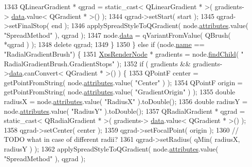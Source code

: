 \begin{DoxyCode}
1343             QLinearGradient * qgrad = \textcolor{keyword}{static\_cast<} QLinearGradient * \textcolor{keyword}{>}( gradients->
      \hyperlink{classXpsRenderNode_a1b07b9ac5eb86bec6d9f94ec5c855065}{data}.value< QGradient * >() );
1344             qgrad->setStart( start );
1345             qgrad->setFinalStop( end );
1346             applySpreadStyleToQGradient( node.\hyperlink{classXpsRenderNode_a7f6fca2e06dd119e7eb20139af6c8477}{attributes}.value( \textcolor{stringliteral}{"SpreadMethod"} ), qgrad );
1347             node.\hyperlink{classXpsRenderNode_a1b07b9ac5eb86bec6d9f94ec5c855065}{data} = qVariantFromValue( QBrush( *qgrad ) );
1348             \textcolor{keyword}{delete} qgrad;
1349         \}
1350     \} \textcolor{keywordflow}{else} \textcolor{keywordflow}{if} (node.\hyperlink{classXpsRenderNode_a7b3d33b9669c0235e095d5efc870ccf0}{name} == \textcolor{stringliteral}{"RadialGradientBrush"}) \{
1351         \hyperlink{classXpsRenderNode}{XpsRenderNode} * gradients = node.\hyperlink{classXpsRenderNode_a91777855666ee3b327a67485b9d50f84}{findChild}( \textcolor{stringliteral}{"
      RadialGradientBrush.GradientStops"} );
1352         \textcolor{keywordflow}{if} ( gradients && gradients->\hyperlink{classXpsRenderNode_a1b07b9ac5eb86bec6d9f94ec5c855065}{data}.canConvert< QGradient * >() ) \{
1353             QPointF center = getPointFromString( node.\hyperlink{classXpsRenderNode_a7f6fca2e06dd119e7eb20139af6c8477}{attributes}.value( \textcolor{stringliteral}{"Center"} ) );
1354             QPointF origin = getPointFromString( node.\hyperlink{classXpsRenderNode_a7f6fca2e06dd119e7eb20139af6c8477}{attributes}.value( \textcolor{stringliteral}{"GradientOrigin"} ) );
1355             \textcolor{keywordtype}{double} radiusX = node.\hyperlink{classXpsRenderNode_a7f6fca2e06dd119e7eb20139af6c8477}{attributes}.value( \textcolor{stringliteral}{"RadiusX"} ).toDouble();
1356             \textcolor{keywordtype}{double} radiusY = node.\hyperlink{classXpsRenderNode_a7f6fca2e06dd119e7eb20139af6c8477}{attributes}.value( \textcolor{stringliteral}{"RadiusY"} ).toDouble();
1357             QRadialGradient * qgrad = \textcolor{keyword}{static\_cast<} QRadialGradient * \textcolor{keyword}{>}( gradients->
      \hyperlink{classXpsRenderNode_a1b07b9ac5eb86bec6d9f94ec5c855065}{data}.value< QGradient * >() );
1358             qgrad->setCenter( center );
1359             qgrad->setFocalPoint( origin );
1360             \textcolor{comment}{// TODO what in case of different radii?}
1361             qgrad->setRadius( qMin( radiusX, radiusY ) );
1362             applySpreadStyleToQGradient( node.\hyperlink{classXpsRenderNode_a7f6fca2e06dd119e7eb20139af6c8477}{attributes}.value( \textcolor{stringliteral}{"SpreadMethod"} ), qgrad );

\end{DoxyCode}
